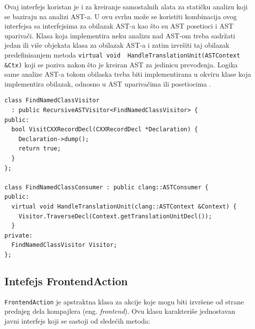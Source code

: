 \documentclass[12pt,oneside]{memoir}
\begin{document}
Ovaj interfejs koristan je i za kreiranje samostalnih alata za stati\v{c}ku analizu koji se baziraju na analizi AST-a. U ovu svrhu mo\v{z}e se koristiti kombinacija
ovog interfejsa sa interfejsima za obilazak AST-a kao \v{s}to su AST posetioci i AST upariva\v{c}i. Klasa koja implementira neku analizu nad AST-om treba sadr\v{z}ati jedan ili vi\v{s}e objekata klasa za obilazak AST-a i zatim izvr\v{s}iti taj obilazak predefinisanjem metoda \lstinline{virtual void  HandleTranslationUnit(ASTContext &Ctx)} koji se poziva nakon \v{s}to je kreiran AST za jedinicu prevođenja. Logika same analize AST-a tokom obilaska treba biti implementirana u okviru klase koja implementira obilazak, odnosno u AST upariva\v{c}ima ili posetiocima \cite{ASTConsumer}.

\begin{lstlisting}[caption={Primer upotrebe klase \textit{ASTConsumer} \cite{ASTToolTutorial}}, label=lst:label7, captionpos=b]
class FindNamedClassVisitor
  : public RecursiveASTVisitor<FindNamedClassVisitor> {
public:
  bool VisitCXXRecordDecl(CXXRecordDecl *Declaration) {
    Declaration->dump();
    return true;
  }
};

class FindNamedClassConsumer : public clang::ASTConsumer {
public:
  virtual void HandleTranslationUnit(clang::ASTContext &Context) {
    Visitor.TraverseDecl(Context.getTranslationUnitDecl());
  }
private:
  FindNamedClassVisitor Visitor;
};
\end{lstlisting}

\subsection{Intefejs FrontendAction}

\lstinline{FrontendAction} je apstraktna klasa za akcije koje mogu biti izvr\v{s}ene od strane prednjeg dela kompajlera (eng. \textit{frontend}).
Ovu klasu karakteri\v{s}e jednostavan javni interfejs koji se sastoji od slede\'{c}ih metoda:
\end{document}
